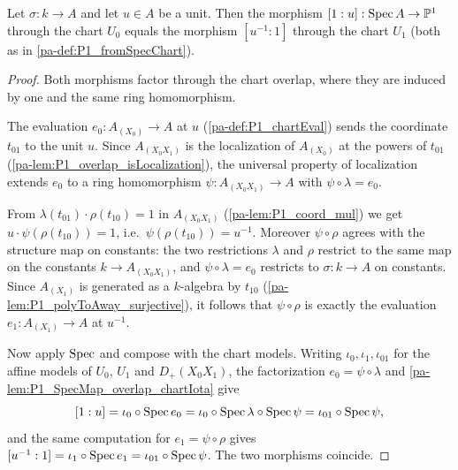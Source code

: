 \begin{theorem}
  \label{pa-thm:P1_gluing_identity}
  \leanok

  Let \(\sigma : k \to A\) and let \(u \in A\) be a unit. Then the morphism
  \([1 : u] : \operatorname{Spec} A \to \mathbb{P}^1\) through the chart \(U_0\) equals the morphism
  \([u^{-1} : 1]\) through the chart \(U_1\) (both as in \ref{pa-def:P1_fromSpecChart}).
\end{theorem}
\begin{proof}
  \leanok
  Both morphisms factor through the chart overlap, where they are induced by one and the
  same ring homomorphism.

  The evaluation \(e_0 : A_{(X_0)} \to A\) at \(u\) (\ref{pa-def:P1_chartEval}) sends the
  coordinate \(t_{01}\) to the unit \(u\). Since \(A_{(X_0X_1)}\) is the localization of
  \(A_{(X_0)}\) at the powers of \(t_{01}\) (\ref{pa-lem:P1_overlap_isLocalization}), the
  universal property of localization extends \(e_0\) to a ring homomorphism
  \(\psi : A_{(X_0X_1)} \to A\) with \(\psi \circ \lambda = e_0\).

  From \(\lambda(t_{01}) \cdot \rho(t_{10}) = 1\) in \(A_{(X_0X_1)}\)
  (\ref{pa-lem:P1_coord_mul}) we get \(u \cdot \psi(\rho(t_{10})) = 1\), i.e.\
  \(\psi(\rho(t_{10})) = u^{-1}\). Moreover \(\psi \circ \rho\) agrees with the structure
  map on constants: the two restrictions \(\lambda\) and \(\rho\) restrict to the same map
  on the constants \(k \to A_{(X_0X_1)}\), and \(\psi \circ \lambda = e_0\) restricts to
  \(\sigma : k \to A\) on constants. Since \(A_{(X_1)}\) is generated as a \(k\)-algebra by
  \(t_{10}\) (\ref{pa-lem:P1_polyToAway_surjective}), it follows that \(\psi \circ \rho\) is
  exactly the evaluation \(e_1 : A_{(X_1)} \to A\) at \(u^{-1}\).

  Now apply \(\operatorname{Spec}\) and compose with the chart models. Writing \(\iota_0, \iota_1,
  \iota_{01}\) for the affine models of \(U_0\), \(U_1\) and \(D_+(X_0X_1)\), the
  factorization \(e_0 = \psi \circ \lambda\) and \ref{pa-lem:P1_SpecMap_overlap_chartIota}
  give
  \[
    [1 : u]
      = \iota_0 \circ \operatorname{Spec} e_0
      = \iota_0 \circ \operatorname{Spec} \lambda \circ \operatorname{Spec} \psi
      = \iota_{01} \circ \operatorname{Spec} \psi ,
  \]
  and the same computation for \(e_1 = \psi \circ \rho\) gives
  \([u^{-1} : 1] = \iota_1 \circ \operatorname{Spec} e_1 = \iota_{01} \circ \operatorname{Spec} \psi\). The two
  morphisms coincide.
\end{proof}


